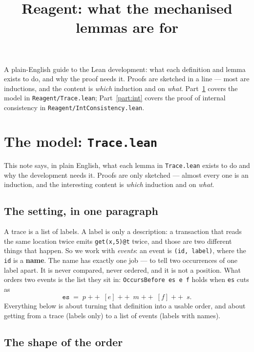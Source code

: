 \documentclass[11pt]{article}
\title{Reagent: what the mechanised lemmas are for}
\author{}
\date{}
\newcommand{\lean}[1]{\texttt{\small #1}}
\begin{document}
\maketitle

\noindent
A plain-English guide to the Lean development: what each definition and lemma
exists to do, and why the proof needs it. Proofs are sketched in a line --- most
are inductions, and the content is \emph{which} induction and on \emph{what}.
Part~\ref{part:model} covers the model in \texttt{Reagent/Trace.lean};
Part~\ref{part:int} covers the proof of internal consistency in
\texttt{Reagent/IntConsistency.lean}.

\tableofcontents

\section{The model: \texttt{Trace.lean}}
\label{part:model}

\noindent
This note says, in plain English, what each lemma in \texttt{Trace.lean} exists
to do and why the development needs it. Proofs are only sketched --- almost
every one is an induction, and the interesting content is \emph{which} induction
and on \emph{what}.

\subsection{The setting, in one paragraph}

A trace is a list of labels. A label is only a description: a transaction that
reads the same location twice emits \lean{get(x,5)@t} twice, and those are two
different things that happen. So we work with \emph{events}: an event is
\lean{(id, label)}, where the \lean{id} is a \textbf{name}. The name has exactly
one job --- to tell two occurrences of one label apart. It is never compared,
never ordered, and it is not a position. What orders two events is the list they
sit in: \lean{OccursBefore es e f} holds when \lean{es} cuts as
\[
  \texttt{es} \;=\; p \;\mathbin{+\!\!+}\; [e] \;\mathbin{+\!\!+}\; m
  \;\mathbin{+\!\!+}\; [f] \;\mathbin{+\!\!+}\; s .
\]
Everything below is about turning that definition into a usable order, and about
getting from a trace (labels only) to a list of events (labels with names).

\subsection{The shape of the order}
\end{document}
